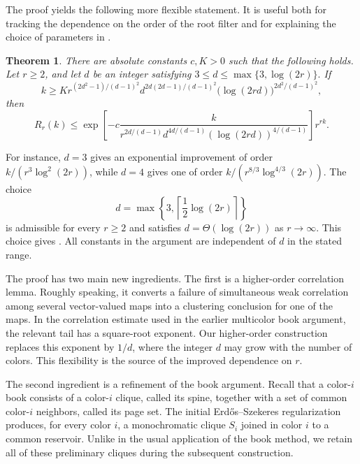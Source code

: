 \documentclass[twoside,12pt]{article}
\newtheorem{theorem}{Theorem}[section]
\theoremstyle{definition}
\theoremstyle{remark}
\newcommand{\1}{\mathbf 1}
\begin{document}
The proof yields the following more flexible statement. It is useful both for
tracking the dependence on the order of the root filter and for explaining the
choice of parameters in .

\begin{theorem}\label{thm:parameterised-main}
There are absolute constants $c,K>0$ such that the following holds. Let
$r\ge2$, and let $d$ be an integer satisfying
$
 3\le d\le\max\{3,\log(2r)\}.
$
If
\begin{equation}\label{eq:parameter-threshold}
 k\ge
 K r^{(2d^2-1)/(d-1)^2}
 d^{2d(2d-1)/(d-1)^2}
 \bigl(\log(2rd)\bigr)^{2d^2/(d-1)^2},
\end{equation}
then
\begin{equation}\label{eq:parameter-saving}
 R_r(k)\le
 \exp\!\left[
 -c\frac{k}{
 r^{2d/(d-1)}d^{4d/(d-1)}
 (\log(2rd))^{4/(d-1)}}
 \right]r^{rk}.
\end{equation}
\end{theorem}

For instance, $d=3$ gives an exponential improvement of order
$k/(r^3\log^2(2r))$, while $d=4$ gives one of order
$k/(r^{8/3}\log^{4/3}(2r))$. The choice
\[
 d=\max\left\{3,\left\lceil\frac12\log(2r)\right\rceil\right\}
\]
is admissible for every $r\ge2$ and satisfies $d=\Theta(\log(2r))$ as
$r\to\infty$. This choice gives . All constants in the
argument are independent of $d$ in the stated range.

The proof has two main new ingredients. The first is a higher-order
correlation lemma. Roughly speaking, it converts a failure of simultaneous
weak correlation among several vector-valued maps into a clustering
conclusion for one of the maps. In the correlation estimate used in the
earlier multicolor book argument, the relevant tail has a square-root
exponent. Our higher-order construction replaces this exponent by $1/d$,
where the integer $d$ may grow with the number of colors. This flexibility is
the source of the improved dependence on $r$.

The second ingredient is a refinement of the book argument. Recall that a
color-$i$ book consists of a color-$i$ clique, called its spine, together
with a set of common color-$i$ neighbors, called its page set. The initial
Erd\H{o}s--Szekeres regularization produces, for every color $i$, a
monochromatic clique $S_i$ joined in color $i$ to a common reservoir. Unlike
in the usual application of the book method, we retain all of these
preliminary cliques during the subsequent construction.
\end{document}
